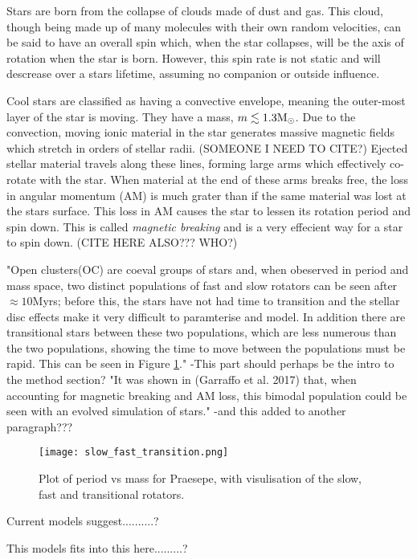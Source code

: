 \documentclass[fleqn,usenatbib]{mnras}
\begin{document}
Stars are born from the collapse of clouds made of dust and gas.
This cloud, though being made up of many molecules with their own random velocities, can be said to have an overall spin which, when the star collapses, will be the axis of rotation when the star is born.
However, this spin rate is not static and will descrease over a stars lifetime, assuming no companion or outside influence.

Cool stars are classified as having a convective envelope, meaning the outer-most layer of the star is moving.
They have a mass, $m \lesssim 1.3 \textup{M}_\odot$. 
Due to the convection, moving ionic material in the star generates massive magnetic fields which stretch in orders of stellar radii. (SOMEONE I NEED TO CITE?)
Ejected stellar material travels along these lines, forming large arms which effectively co-rotate with the star.
When material at the end of these arms breaks free, the loss in angular momentum (AM) is much grater than if the same material was lost at the stars surface.
This loss in AM causes the star to lessen its rotation period and spin down.
This is called \textit{magnetic breaking} and is a very effecient way for a star to spin down. (CITE HERE ALSO??? WHO?)

"Open clusters(OC) are coeval groups of stars and, when obeserved in period and mass space, two distinct populations of fast and slow rotators can be seen after $\approx 10$Myrs; before this, the stars have not had time to transition and the  stellar disc effects make it very difficult to paramterise and model.
In addition there are  transitional stars between these two populations, which are less numerous than the two populations, showing the time to move between the populations must be rapid.
This can be seen in Figure \ref{fig:slow_fast_transition}."
-This part should perhaps be the intro to the method section?
"It was shown in (Garraffo et al. 2017) that, when accounting for magnetic breaking and AM loss, this bimodal population could be seen with an evolved simulation of stars."
-and this added to another paragraph???

\begin{figure}
	\texttt{[image: slow\_fast\_transition.png]}
	\caption[]{Plot of period vs mass for Praesepe, with visulisation of the slow, fast and transitional rotators.}
	\label{fig:slow_fast_transition}
\end{figure}

Current models suggest..........?

This models fits into this here.........?
\end{document}
